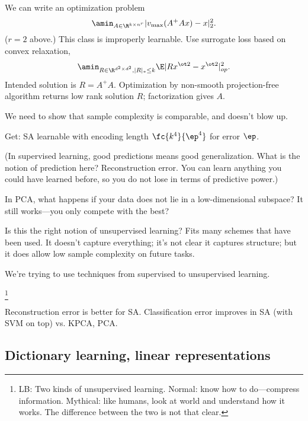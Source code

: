 We can write an optimization problem
$$
\amin_{A\in \R^{k\times n^r}} |v_{\max}(A^+Ax)-x|_2^2.
$$
($r=2$ above.)
This class is improperly learnable. Use surrogate loss based on convex relaxation,
$$
\amin_{R\in \R^{d^2\times d^2},|R|_*\le k} \E |Rx^{\ot 2} - x^{\ot 2}|_{op}^2. 
$$
Intended solution is $R=A^+A$. Optimization by non-smooth projection-free algorithm returns low rank solution $R$; factorization gives $A$.

We need to show that sample complexity is comparable, and doesn't blow up.

Get: SA learnable with encoding length $\fc{k^4}{\ep^4}$ for error $\ep$. 

(In supervised learning, good predictions means good generalization. What is the notion of prediction here?
Reconstruction error. 
You can learn anything you could have learned before, so you do not lose in terms of predictive power.)



In PCA, what happens if your data does not lie in a low-dimensional subspace? It still works---you only compete with the best?

Is this the right notion of unsupervised learning?
Fits many schemes that have been used. It doesn't capture everything; it's not clear it captures structure; but it does allow low sample complexity on future tasks.

We're trying to use techniques from supervised to unsupervised learning.


\footnote{LB: Two kinds of unsupervised learning. Normal: know how to do---compress information. Mythical: like humans, look at world and understand how it works. The difference between the two is not that clear.}

Reconstruction error is better for SA. Classification error improves in SA (with SVM on top) vs. KPCA, PCA.

\subsection{Dictionary learning, linear representations}


